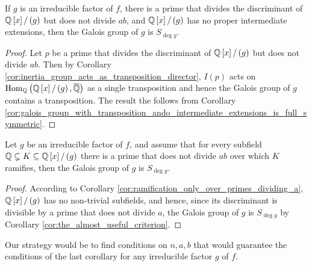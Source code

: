 \documentclass[../main.tex]{subfiles}
\begin{document}
\begin{corollary}
  \label{cor:the_almost_useful_criterion}
  If $g$ is an irreducible factor of $f$, there is a prime that divides the discriminant of $\mathbb{Q}\left[ x \right] / \left( g \right)$ but does not divide $a b$, and $\mathbb{Q}\left[ x \right] / \left( g \right)$ has no proper intermediate extensions, then the Galois group of $g$ is $S_{\deg g}$.
\end{corollary}
\begin{proof}
  Let $p$ be a prime that divides the discriminant of $\mathbb{Q}\left[ x \right] / \left( g \right)$ but does not divide $a b$.
  Then by Corollary \ref{cor:inertia_group_acts_as_transposition_director}, $I\left( p \right)$ acts on $\operatorname{\rm Hom}_{\mathbb{Q}}\left( \mathbb{Q}\left[ x \right] / \left( g \right), \overline{\mathbb{Q}} \right)$ as a single transposition and hence the Galois group of $g$ contains a transposition.
  The result the follows from Corollary \ref{cor:galois_group_with_transposition_ando_intermediate_extensions_is_full_symmetric}.
\end{proof}
\begin{corollary}
  \label{cor:the_useful_criterion}
  Let $g$ be an irreducible factor of $f$, and assume that for every subfield $\mathbb{Q} \subsetneq K \subseteq \mathbb{Q}\left[ x \right] / \left( g \right)$ there is a prime that does not divide $a b$ over which $K$ ramifies, then the Galois group of $g$ is $S_{\deg g}$.
\end{corollary}
\begin{proof}
  According to Corollary \ref{cor:ramification_only_over_primes_dividing_a}, $\mathbb{Q}\left[ x \right] / \left( g \right)$ has no non-trivial subfields, and hence, since its discriminant is divisible by a prime that does not divide $a$, the Galois group of $g$ is $S_{\deg g}$ by Corollary \ref{cor:the_almost_useful_criterion}.
\end{proof}

Our strategy would be to find conditions on $n,a,b$ that would guarantee the conditions of the last corollary for any irreducible factor $g$ of $f$.
\end{document}
